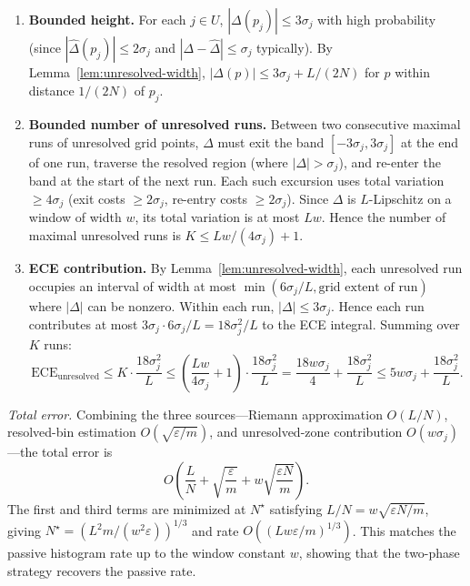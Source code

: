 \documentclass{article}
\newcommand{\ECE}{\mathrm{ECE}}
\newcommand{\Lip}{L}
\newcommand{\errrate}{\varepsilon}
\newcommand{\nsamples}{m}
\newcommand{\calmap}{\Delta}
\theoremstyle{definition}
\begin{document}
\begin{enumerate}
\item[\emph{(i)}] \textbf{Bounded height.} For each $j \in U$, $|\calmap(p_j)| \leq 3\sigma_j$ with high probability (since $|\hat\calmap(p_j)| \leq 2\sigma_j$ and $|\calmap - \hat\calmap| \leq \sigma_j$ typically). By Lemma~\ref{lem:unresolved-width}, $|\calmap(p)| \leq 3\sigma_j + \Lip/(2N)$ for $p$ within distance $1/(2N)$ of $p_j$.

\item[\emph{(ii)}] \textbf{Bounded number of unresolved runs.} Between two consecutive maximal runs of unresolved grid points, $\calmap$ must exit the band $[-3\sigma_j, 3\sigma_j]$ at the end of one run, traverse the resolved region (where $|\calmap| > \sigma_j$), and re-enter the band at the start of the next run. Each such excursion uses total variation $\geq 4\sigma_j$ (exit costs $\geq 2\sigma_j$, re-entry costs $\geq 2\sigma_j$). Since $\calmap$ is $\Lip$-Lipschitz on a window of width $w$, its total variation is at most $\Lip w$. Hence the number of maximal unresolved runs is $K \leq \Lip w / (4\sigma_j) + 1$.

\item[\emph{(iii)}] \textbf{ECE contribution.} By Lemma~\ref{lem:unresolved-width}, each unresolved run occupies an interval of width at most $\min(6\sigma_j/\Lip, \text{grid extent of run})$ where $|\calmap|$ can be nonzero. Within each run, $|\calmap| \leq 3\sigma_j$. Hence each run contributes at most $3\sigma_j \cdot 6\sigma_j/\Lip = 18\sigma_j^2/\Lip$ to the ECE integral. Summing over $K$ runs:
\[
\ECE_{\mathrm{unresolved}} \leq K \cdot \frac{18\sigma_j^2}{\Lip} \leq \left(\frac{\Lip w}{4\sigma_j} + 1\right) \cdot \frac{18\sigma_j^2}{\Lip} = \frac{18 w \sigma_j}{4} + \frac{18\sigma_j^2}{\Lip} \leq 5 w \sigma_j + \frac{18\sigma_j^2}{\Lip}.
\]
\end{enumerate}

\emph{Total error.} Combining the three sources---Riemann approximation $O(\Lip/N)$, resolved-bin estimation $O(\sqrt{\errrate/\nsamples})$, and unresolved-zone contribution $O(w\sigma_j)$---the total error is
\[
O\!\left(\frac{\Lip}{N} + \sqrt{\frac{\errrate}{\nsamples}} + w\sqrt{\frac{\errrate N}{\nsamples}}\right).
\]
The first and third terms are minimized at $N^\star$ satisfying $\Lip/N = w\sqrt{\errrate N/\nsamples}$, giving $N^\star = (\Lip^2\nsamples/(w^2\errrate))^{1/3}$ and rate $O((\Lip w\errrate/\nsamples)^{1/3})$. This matches the passive histogram rate up to the window constant $w$, showing that the two-phase strategy recovers the passive rate.
\end{document}
